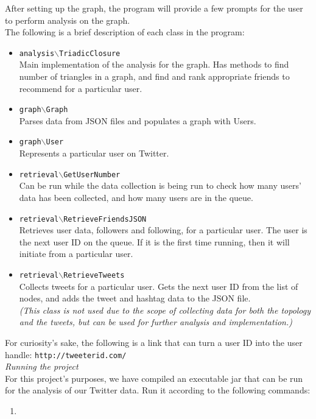 \documentclass[letterpaper]{article}
\begin{document}
\noindent After setting up the graph, the program will provide a few prompts for the user to perform analysis on the graph.\\

\noindent The following is a brief description of each class in the program:
\begin{itemize}
\item \texttt{analysis$\backslash$TriadicClosure}\\
Main implementation of the analysis for the graph. Has methods to find number of triangles in a graph, and find and rank appropriate friends to recommend for a particular user. 

\item \texttt{graph$\backslash$Graph}\\
Parses data from JSON files and populates a graph with Users.

\item \texttt{graph$\backslash$User}\\
Represents a particular user on Twitter.

\item \texttt{retrieval$\backslash$GetUserNumber}\\
Can be run while the data collection is being run to check how many users' data has been collected, and how many users are in the queue.

\item \texttt{retrieval$\backslash$RetrieveFriendsJSON}\\
Retrieves user data, followers and following, for a particular user. The user is the next user ID on the queue. If it is the first time running, then it will initiate from a particular user.

\item \texttt{retrieval$\backslash$RetrieveTweets}\\
Collects tweets for a particular user. Gets the next user ID from the list of nodes, and adds the tweet and hashtag data to the JSON file.\\
\textit{(This class is not used due to the scope of collecting data for both the topology and the tweets, but can be used for further analysis and implementation.)}
\end{itemize}

For curiosity's sake, the following is a link that can turn a user ID into the user handle: \texttt{http://tweeterid.com/}\\

\noindent\textit{Running the project}\\
For this project's purposes, we have compiled an executable jar that can be run for the analysis of our Twitter data. Run it according to the following commands:

\begin{enumerate}
\item 


\end{enumerate}
\end{document}
